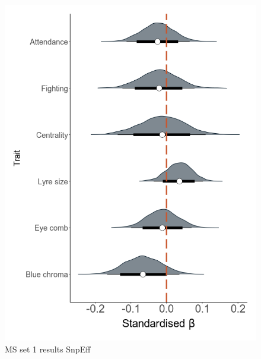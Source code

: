 \documentclass[
  letterpaper,
  DIV=11,
  numbers=noendperiod]{scrreprt}
\begin{document}
\begin{figure}

{\centering \includegraphics{qmd/../plots/sup/extended_4_high_left_load_traits.png}

}

\caption{MS set 1 results SnpEff}

\end{figure}
\end{document}
